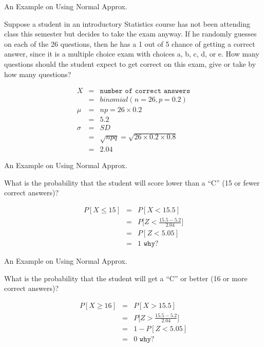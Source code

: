 \documentclass[14pt]{beamer}\usepackage[]{graphicx}\usepackage[]{color}
\begin{document}
\begin{frame}[fragile]{An Example on Using Normal Approx.}

{\footnotesize{
Suppose a student in an introductory Statistics course has not been attending class this semester but decides to take the exam anyway. If he randomly guesses on each of the 26 questions, then he has a 1 out of 5 chance of getting a correct answer, since it is a multiple choice exam with choices a, b, c, d, or e. How many questions should the student expect to get correct on this exam, give or take by how many questions?

\begin{eqnarray*}
X &=& \texttt{number of correct answers} \\
  &=& binomial(n = 26, p = 0.2) \\
\mu  &=& np = 26 \times 0.2 \\
  &=& 5.2 \\
\sigma &=& SD \\
  &=& \sqrt{npq} = \sqrt{26 \times 0.2 \times 0.8} \\
  &=& 2.04
\end{eqnarray*}  
}}

\end{frame}

\begin{frame}[fragile]{An Example on Using Normal Approx.}

What is the probability that the student will score lower than a ``C'' (15 or fewer correct answers)?

\begin{eqnarray*}
P[X \le 15] &=& P[X < 15.5] \\
  &=& P\Big[Z < \frac{15.5 - 5.2}{2.04} \Big] \\
  &=& P[ Z < 5.05] \\
  &=& 1  \texttt{ why? }
\end{eqnarray*}

\end{frame}

\begin{frame}[fragile]{An Example on Using Normal Approx.}

What is the probability that the student will get a  ``C'' or better (16 or more correct answers)?

\begin{eqnarray*}
P[X \ge 16] &=& P[X > 15.5] \\
  &=& P\Big[Z > \frac{15.5 - 5.2}{2.04} \Big] \\
  &=& 1 - P[ Z < 5.05] \\
  &=& 0  \texttt{ why? }
\end{eqnarray*}

\end{frame}
\end{document}
